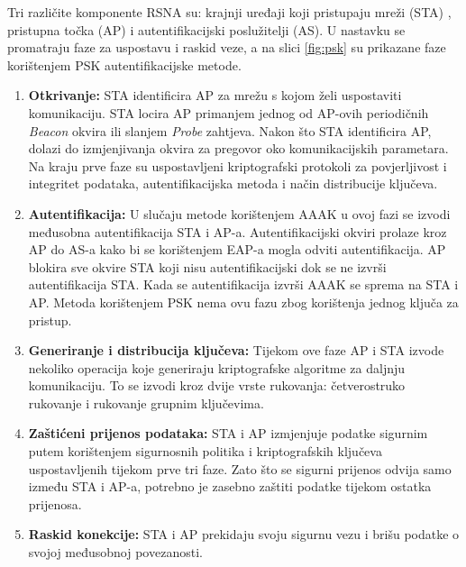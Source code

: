\documentclass[times, utf8, diplomski]{fer}
\begin{document}
Tri različite komponente RSNA su: krajnji uređaji koji pristupaju mreži (STA) , pristupna točka (AP)  i autentifikacijski poslužitelji (AS). U nastavku se promatraju faze za uspostavu i raskid veze, a na slici \ref{fig:psk} su prikazane faze korištenjem PSK autentifikacijske metode.
\begin{enumerate}
    \item\textbf{Otkrivanje:} STA identificira AP za mrežu s kojom želi uspostaviti komunikaciju. STA locira AP primanjem jednog od AP-ovih periodičnih \emph{Beacon} okvira ili slanjem \emph{Probe} zahtjeva. Nakon što STA identificira AP, dolazi do izmjenjivanja okvira za pregovor oko komunikacijskih parametara. Na kraju prve faze su uspostavljeni kriptografski protokoli za povjerljivost i integritet podataka, autentifikacijska metoda i način distribucije ključeva.
    \item\textbf{Autentifikacija:} U slučaju metode korištenjem AAAK u ovoj fazi se izvodi međusobna autentifikacija STA i AP-a. Autentifikacijski okviri prolaze kroz AP do AS-a kako bi se korištenjem EAP-a mogla odviti autentifikacija. AP blokira sve okvire STA koji nisu autentifikacijski dok se ne izvrši autentifikacija STA. Kada se autentifikacija izvrši AAAK se sprema na STA i AP. Metoda korištenjem PSK nema ovu fazu zbog korištenja jednog ključa za pristup.
    \item\textbf{Generiranje i distribucija ključeva:} Tijekom ove faze AP i STA izvode nekoliko operacija koje generiraju kriptografske algoritme za daljnju komunikaciju. To se izvodi kroz dvije vrste rukovanja: četverostruko rukovanje i rukovanje grupnim ključevima.
    \item\textbf{Zaštićeni prijenos podataka:} STA i AP izmjenjuje podatke sigurnim putem korištenjem sigurnosnih politika i kriptografskih ključeva uspostavljenih tijekom prve tri faze. Zato što se sigurni prijenos odvija samo između STA i AP-a, potrebno je zasebno zaštiti podatke tijekom ostatka prijenosa.
    \item\textbf{Raskid konekcije:} STA i AP prekidaju svoju sigurnu vezu i brišu podatke o svojoj međusobnoj povezanosti\citep{NIST}.
\end{enumerate}
\end{document}
